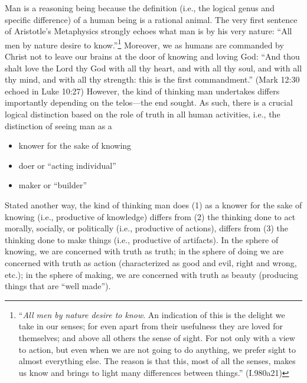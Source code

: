 Man is a reasoning being because the definition (i.e., the logical genus and specific difference) of a human being is a rational animal. The very first sentence of Aristotle’s Metaphysics strongly echoes what man is by his very nature: ``All men by nature desire to know.''\footnote{``\emph{All men by nature desire to know}. An indication of this is the delight we take in our senses; for even apart from their usefulness they are loved for themselves; and above all others the sense of sight. For not only with a view to action, but even when we are not going to do anything, we prefer sight to almost everything else. The reason is that this, most of all the senses, makes us know and brings to light many differences between things.'' (I.980a21)} Moreover, we as humans are commanded by Christ not to leave our brains at the door of knowing and loving God: ``And thou shalt love the Lord thy God with all thy heart, and with all thy soul, and with all thy mind, and with all thy strength: this is the first commandment.'' (Mark 12:30 echoed in Luke 10:27) However, the kind of thinking man undertakes differs importantly depending on the telos---the end sought. As such, there is a crucial logical distinction based on the role of truth in all human activities, i.e., the distinction of seeing man as a

\begin{itemize}
\item knower for the sake of knowing
\item doer or ``acting individual''
\item maker or ``builder''
\end{itemize}

Stated another way, the kind of thinking man does (1) as a knower for the sake of knowing (i.e., productive of knowledge) differs from (2) the thinking done to act morally, socially, or politically (i.e., productive of actions), differs from (3) the thinking done to make things (i.e., productive of artifacts). In the sphere of knowing, we are concerned with truth as truth; in the sphere of doing we are concerned with truth as action (characterized as good and evil, right and wrong, etc.); in the sphere of making, we are concerned with truth as beauty (producing things that are ``well made'').

